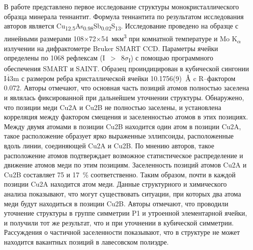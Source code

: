 В работе \cite{Makovicky2005} представлено первое исследование структуры монокристаллического образца минерала теннантит. Формула теннантита по результатом исследования авторов является Cu\textsubscript{12.5}As\textsubscript{0.98}Sb\textsubscript{0.02}S\textsubscript{13}. Исследование проведено на образце с линейными размерами 108$\times$72$\times$54~мкм\textsuperscript{3} при комнатной температуре и Mo K\textsubscript{$\alpha$} излучении на дифрактометре Bruker SMART CCD. Параметры ячейки определены по 1068 рефлексам (I~$>$~8$\sigma$\textsubscript{I}) с помощью программного обеспечения SMART и SAINT. Образец проиндицирован в кубической сингонии I$\overline{\!4}$3m с размером ребра кристаллической ячейки 10.1756(9)~$\mbox{\normalfont\AA}$ c R--фактором 0.072. Авторы отмечают, что основная часть позиций атомов полностью заселена и являлась фиксированной при дальнейшем уточнении структуры. Обнаружено, что позиции меди Cu2A и Cu2B не полностью заселены, и установлена корреляция между фактором смещения и заселенностью атомов в этих позициях. Между двумя атомами в позиции Cu2B находится один атом в позиции Cu2A, такое расположение образует ярко выраженные эллипсоиды, расположенные вдоль линии, соединяющей Cu2A и Cu2B.  По мнению авторов, такое расположение атомов подтверждает возможное статистическое распределение и движение атомов меди  по этим позициям. Заселенность позиций атомов Cu2A и Cu2B составляет 75 и 17~\% соответственно. Таким образом, почти в каждой позиции Cu2A находится атом меди. Данные структурного и химического анализа показывают, что могут существовать ситуации, при которых два атома меди будут находиться в позиции  Cu2B. Авторы отмечают, что проводили уточнение структуры в группе симметрии P1 и утроенной элементарной ячейки, и получили тот же результат, что и при уточнении в кубической симметрии. Рассуждения о частичной заселенности показывают, что в структуре не может находится вакантных позиций в лавесовском полиэдре.



